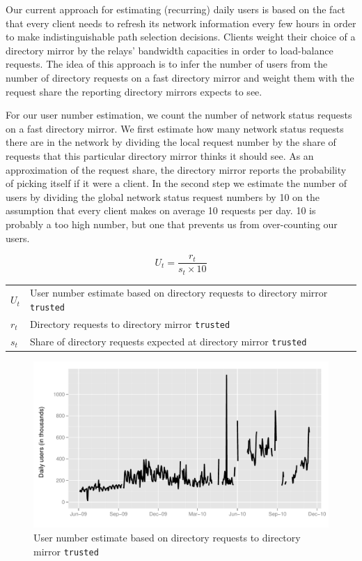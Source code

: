 \documentclass{article}
\begin{document}
Our current approach for estimating (recurring) daily users is based on
the fact that every client needs to refresh its network information every
few hours in order to make indistinguishable path selection decisions.
Clients weight their choice of a directory mirror by the relays' bandwidth
capacities in order to load-balance requests.
The idea of this approach is to infer the number of users from the number
of directory requests on a fast directory mirror and weight them with the
request share the reporting directory mirrors expects to see.

For our user number estimation, we count the number of network status
requests on a fast directory mirror.
We first estimate how many network status requests there are in the
network by dividing the local request number by the share of requests that
this particular directory mirror thinks it should see.
As an approximation of the request share, the directory mirror reports
the probability of picking itself if it were a client.
In the second step we estimate the number of users by dividing the global
network status request numbers by 10 on the assumption that every client
makes on average 10 requests per day.
10 is probably a too high number, but one that prevents us from
over-counting our users.

\begin{equation}
U_t = \frac{r_t}{s_t \times 10}
\end{equation}

\begin{center}
\begin{tabular}{p{0.75cm}p{9cm}}
$U_t$ & User number estimate based on directory requests to directory
mirror \texttt{trusted}\\
$r_t$ & Directory requests to directory mirror \texttt{trusted}\\
$s_t$ & Share of directory requests expected at directory mirror
\texttt{trusted}\\
\end{tabular}
\end{center}

\begin{figure}[t]
\includegraphics[width=\textwidth]{trusted.pdf}
\caption{User number estimate based on directory requests to directory
mirror \texttt{trusted}}
\label{fig:trusted}
\end{figure}
\end{document}
